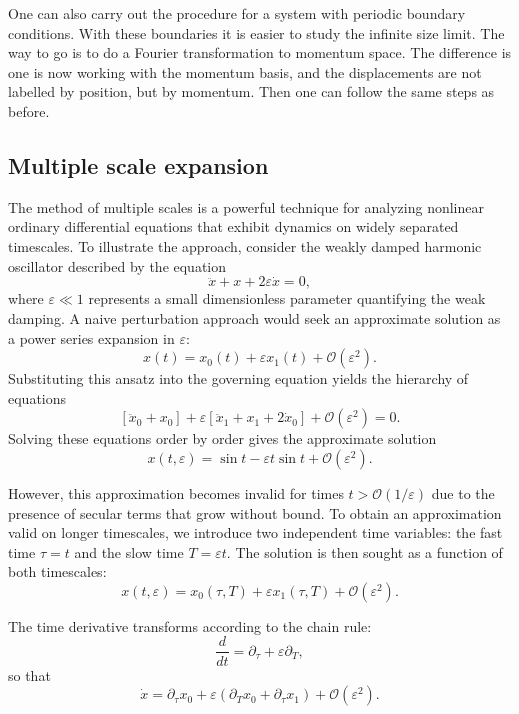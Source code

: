 \documentclass[11pt, a4paper]{article} %
\begin{document}
One can also carry out the procedure for a system with periodic boundary conditions. With these boundaries it is easier 
to study the infinite size limit.
The way to go is to do a Fourier transformation to momentum space. The difference is one is now working with 
the momentum basis, and the displacements are not labelled by position, but by momentum. Then one can follow the same steps as before.

\subsection{Multiple scale expansion}
\label{subsec:mse}

 The method of multiple scales is a powerful technique for analyzing nonlinear ordinary differential equations that exhibit dynamics on widely separated timescales. To illustrate the approach, consider the weakly damped harmonic oscillator described by the equation
\[
\ddot{x} + x + 2\varepsilon \dot{x} = 0,
\]
where $\varepsilon \ll 1$ represents a small dimensionless parameter quantifying the weak damping. A naive perturbation approach would seek an approximate solution as a power series expansion in $\varepsilon$:
\[
x(t) = x_0(t) + \varepsilon x_1(t) + \mathcal{O}(\varepsilon^2).
\]
Substituting this ansatz into the governing equation yields the hierarchy of equations
\[
[\ddot{x}_0 + x_0] + \varepsilon[\ddot{x}_1 + x_1 + 2\dot{x}_0] + \mathcal{O}(\varepsilon^2) = 0.
\]
Solving these equations order by order gives the approximate solution
\[
x(t,\varepsilon) = \sin t - \varepsilon t\sin t + \mathcal{O}(\varepsilon^2).
\]

However, this approximation becomes invalid for times $t > \mathcal{O}(1/\varepsilon)$ due to the presence of 
secular terms that grow without bound. To obtain an approximation valid on longer timescales, we introduce two 
independent time variables: the fast time $\tau = t$ and the slow time $T = \varepsilon t$. The solution is 
then sought as a function of both timescales:
\[
x(t,\varepsilon) = x_0(\tau,T) + \varepsilon x_1(\tau,T) + \mathcal{O}(\varepsilon^2).
\]

The time derivative transforms according to the chain rule:
\[
\frac{d}{dt} = \partial_\tau + \varepsilon \partial_T,
\]
so that
\[
\dot{x} = \partial_\tau x_0 + \varepsilon(\partial_T x_0 + \partial_\tau x_1) + \mathcal{O}(\varepsilon^2).
\]
\end{document}
